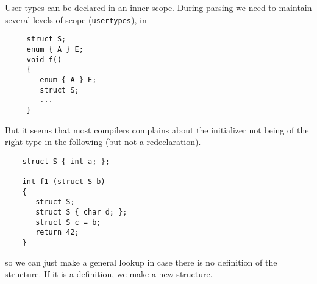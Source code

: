 \begin{docpart}
User types can be declared in an inner scope. During parsing we need
to maintain several levels of scope (\texttt{usertypes}), \eg in
  \begin{verbatim}
     struct S;
     enum { A } E;
     void f()
     {
        enum { A } E;
        struct S;
        ...
     }
  \end{verbatim}
But it seems that most compilers complains about the initializer not
being of the right type in the following (but not a redeclaration).
  \begin{verbatim}
    struct S { int a; };

    int f1 (struct S b)
    {
       struct S;
       struct S { char d; };
       struct S c = b;
       return 42;
    }
  \end{verbatim}
so we can just make a general lookup in case there is no definition of
the structure. If it is a definition, we make a new structure.


\end{docpart}
